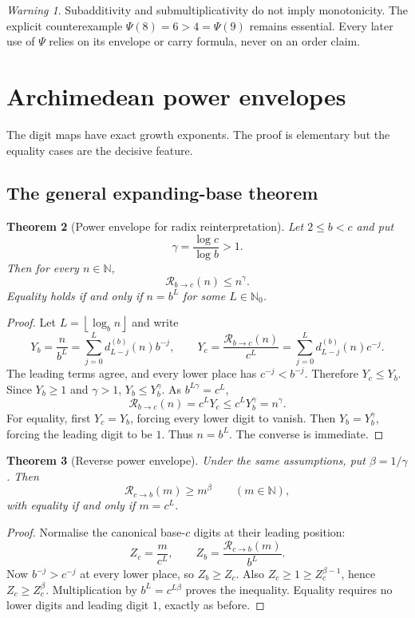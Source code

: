\documentclass[11pt]{article}
\newtheorem{theorem}{Theorem}[section]
\theoremstyle{definition}
\theoremstyle{remark}
\newtheorem{warning}[theorem]{Warning}
\newcommand{\N}{\mathbb N}
\newcommand{\Nzero}{\mathbb N_0}
\newcommand{\floor}[1]{\left\lfloor #1\right\rfloor}
\newcommand{\PsiMap}{\Psi}
\newcommand{\Rad}{\mathcal R}
\begin{document}
\begin{warning}
Subadditivity and submultiplicativity do not imply monotonicity.  The explicit
counterexample $\PsiMap(8)=6>4=\PsiMap(9)$ remains essential.  Every later use
of $\PsiMap$ relies on its envelope or carry formula, never on an order claim.
\end{warning}

\section{Archimedean power envelopes}

The digit maps have exact growth exponents.  The proof is elementary but the
equality cases are the decisive feature.

\subsection{The general expanding-base theorem}

\begin{theorem}[Power envelope for radix reinterpretation]\label{thm:envelope-general}
Let $2\le b<c$ and put
\[
  \gamma=\frac{\log c}{\log b}>1.
\]
Then for every $n\in\N$,
\[
  \Rad_{b\to c}(n)\le n^\gamma.
\]
Equality holds if and only if $n=b^L$ for some $L\in\Nzero$.
\end{theorem}

\begin{proof}
Let $L=\floor{\log_b n}$ and write
\[
 Y_b=\frac{n}{b^L}
   =\sum_{j=0}^{L}d_{L-j}^{(b)}(n)b^{-j},
 \qquad
 Y_c=\frac{\Rad_{b\to c}(n)}{c^L}
   =\sum_{j=0}^{L}d_{L-j}^{(b)}(n)c^{-j}.
\]
The leading terms agree, and every lower place has $c^{-j}<b^{-j}$.
Therefore $Y_c\le Y_b$.  Since $Y_b\ge1$ and $\gamma>1$,
$Y_b\le Y_b^\gamma$.  As $b^{L\gamma}=c^L$,
\[
 \Rad_{b\to c}(n)=c^LY_c
 \le c^LY_b^\gamma=n^\gamma.
\]
For equality, first $Y_c=Y_b$, forcing every lower digit to vanish.  Then
$Y_b=Y_b^\gamma$, forcing the leading digit to be $1$.  Thus $n=b^L$.
The converse is immediate.
\end{proof}

\begin{theorem}[Reverse power envelope]\label{thm:reverse-envelope}
Under the same assumptions, put $\beta=1/\gamma$.  Then
\[
  \Rad_{c\to b}(m)\ge m^\beta
  \qquad(m\in\N),
\]
with equality if and only if $m=c^L$.
\end{theorem}

\begin{proof}
Normalise the canonical base-$c$ digits at their leading position:
\[
 Z_c=\frac{m}{c^L},\qquad
 Z_b=\frac{\Rad_{c\to b}(m)}{b^L}.
\]
Now $b^{-j}>c^{-j}$ at every lower place, so $Z_b\ge Z_c$.  Also
$Z_c\ge1\ge Z_c^{\beta-1}$, hence $Z_c\ge Z_c^\beta$.  Multiplication by
$b^L=c^{L\beta}$ proves the inequality.  Equality requires no lower digits
and leading digit $1$, exactly as before.
\end{proof}
\end{document}
